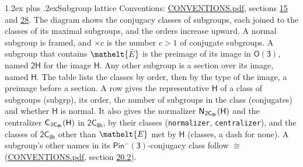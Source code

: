 \documentclass[10pt,a4paper]{article}
\makeatletter
\renewcommand\section{\@startsection{section}{1}{\z@}{-3ex plus -1ex minus -.2ex}%
  {1.2ex plus .2ex}{\normalfont\large\sffamily\bfseries\color{parttitle}}}
\numberwithin{equation}{section}
\newcommand{\eltfont}[1]{{\let\sigma\eltsigma\mathelt{#1}}}
\newcommand{\grp}[1]{\mathsf{#1}}
\newcommand{\cls}[1]{\eltfont{#1}}
\newcommand{\elt}[1]{\eltfont{#1}}
\newcommand{\samecls}{\cong}
\newcommand{\barred}[1]{\bar{#1}}
\newcommand{\hairsp}{\mkern1mu}
\makeatother
\begin{document}
\section{Subgroup lattice}\label{s:subgroups}
Conventions: \href{../../CONVENTIONS.pdf}{CONVENTIONS.pdf}, sections \href{../../../rotation/CONVENTIONS.pdf\#conv.15}{15} and \href{../../CONVENTIONS.pdf\#conv.28}{28}.
The diagram shows the conjugacy classes of subgroups, each joined to the classes of its maximal subgroups, and the orders increase upward. \label{n:index.conjugates.c}A normal subgroup is framed, and ${\times}c$ is the number $c > 1$ of conjugate subgroups. \label{n:group.H}A subgroup that contains $\elt{\barred{E}}$ is the preimage of its image in $\grp{O(3)}$, named $\grp{2H}$ for the image $\grp{H}$. Any other subgroup is a section over its image, named $\grp{H}$. The table lists the classes by order, then by the type of the image, a preimage before a section. \label{n:head.subgroup}\label{n:head.order}\label{n:head.conjugates}\label{n:head.normal}A row gives the representative $\grp{H}$ of a class of subgroups (subgrp), its order, the number of subgroups in the class (conjugates) and whether $\grp{H}$ is normal. \label{n:group.normalizer}\label{n:group.centralizer}\label{n:head.classes}It also gives the normalizer $\grp{N}_{\hairsp \grp{2C_{8h}}}(\grp{H})$ and the centralizer $\grp{C}_{\hairsp \grp{2C_{8h}}}(\grp{H})$ in $\grp{2C_{8h}}$, by their classes (\texttt{normalizer}, \texttt{centralizer}), and the classes of $\grp{2C_{8h}}$ other than $\cls{E}$ met by $\grp{H}$ (classes, a dash for none). A subgroup's other names in its \href{Pinminus3.pdf}{$\grp{Pin^{-}(3)}$}-conjugacy class follow $\samecls$ (\href{../../CONVENTIONS.pdf}{CONVENTIONS.pdf}, section \href{../../CONVENTIONS.pdf\#conv.20.2}{20.2}).
\end{document}
